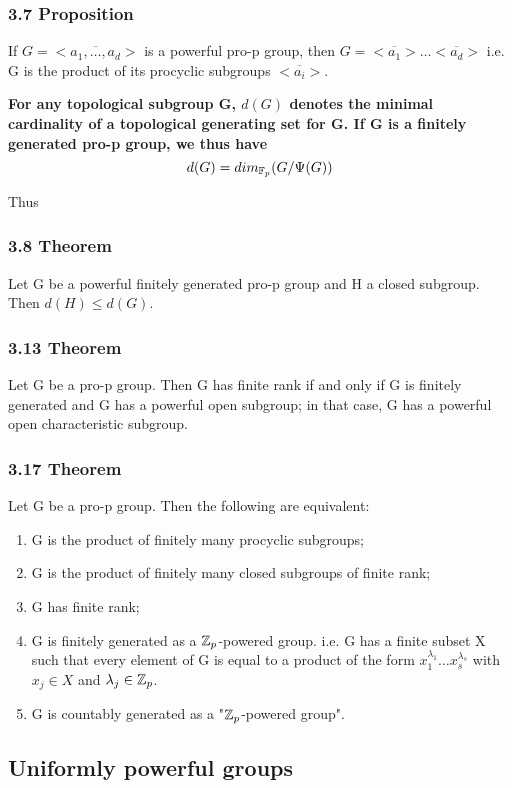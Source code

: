 \subsubsection*{3.7 Proposition}
If $G=\overline{<a_1, \dots, a_d>}$ is a powerful pro-p group, then $G= \overline{<a_1>}\dots\overline{ <a_d>}$ i.e. G is the product of its procyclic subgroups $\overline{<a_i>}$.

\textbf{For any topological subgroup G, $d(G)$ denotes the minimal cardinality of a topological generating set for G. If G is a finitely generated pro-p group, we thus have
$$d(G) = dim_{\mathbb F_p} (G / \Psi(G))$$}

Thus

\subsubsection*{3.8 Theorem}
Let G be a powerful finitely generated pro-p group and H a closed subgroup. Then $d(H)\leq d(G)$.

\subsubsection*{3.13 Theorem}
Let G be a pro-p group. Then G has finite rank if and only if G is finitely generated and G has a powerful open subgroup; in that case, G has a powerful open characteristic subgroup.

\subsubsection*{3.17 Theorem}
Let G be a pro-p group. Then the following are equivalent:
\begin{enumerate}
\item G is the product of finitely many procyclic subgroups;
\item G is the product of finitely many closed subgroups of finite rank;
\item G has finite rank;
\item G is finitely generated as a $\mathbb Z_p$-powered group. i.e. G has a finite subset X such that every element of G is equal to a product of the form $x_1^{\lambda_1} \dots x_s^{\lambda_s}$ with $x_j\in X$ and $\lambda_j \in \mathbb Z_p$.
\item G is countably generated as a "$\mathbb Z_p$-powered group".
\end{enumerate}


\subsection{Uniformly powerful groups}

